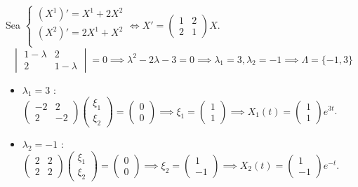 \begin{ejem}
	Sea $\begin{cases}
			(X^1)' =   X^1 + 2 X^2 \\
			(X^2)' = 2 X^1 +  X^2  \\
		\end{cases} \iff X' = \begin{pmatrix}
			1 & 2 \\
			2 & 1
		\end{pmatrix} X$.
	\[\begin{vmatrix}
			1-\lambda & 2         \\
			2         & 1-\lambda
		\end{vmatrix} = 0 \implies \lambda^2 - 2\lambda - 3 = 0 \implies \lambda_1 = 3, \lambda_2 = -1 \implies \Lambda = \{-1, 3\}\]
	\begin{itemize}
		\item $\lambda_1 = 3$ : $\begin{pmatrix}
				      -2 & 2  \\
				      2  & -2
			      \end{pmatrix} \begin{pmatrix}
				      \xi_1 \\
				      \xi_2
			      \end{pmatrix} = \begin{pmatrix}
				      0 \\
				      0
			      \end{pmatrix} \implies \xi_1 = \begin{pmatrix}
				      1 \\
				      1
			      \end{pmatrix} \implies X_1(t) = \begin{pmatrix}
				      1 \\
				      1
			      \end{pmatrix} e^{3t}$.
		\item $\lambda_2 = -1$ : $\begin{pmatrix}
				      2 & 2 \\
				      2 & 2
			      \end{pmatrix} \begin{pmatrix}
				      \xi_1 \\
				      \xi_2
			      \end{pmatrix} = \begin{pmatrix}
				      0 \\
				      0
			      \end{pmatrix} \implies \xi_2 = \begin{pmatrix}
				      1 \\
				      -1
			      \end{pmatrix} \implies X_2(t) = \begin{pmatrix}
				      1 \\
				      -1
			      \end{pmatrix} e^{-t}$.
	\end{itemize}


\end{ejem}
